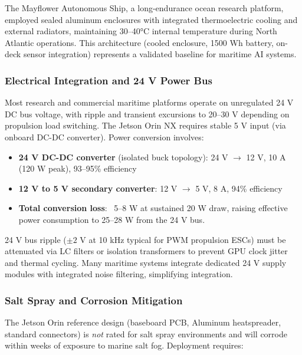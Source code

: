 The Mayflower Autonomous Ship, a long-endurance ocean research platform, employed sealed aluminum enclosures with integrated thermoelectric cooling and external radiators, maintaining 30--40°C internal temperature during North Atlantic operations. \cite{Promare2023MayflowerAutonomousShip} This architecture (cooled enclosure, 1500 Wh battery, on-deck sensor integration) represents a validated baseline for maritime AI systems.

\subsubsection{Electrical Integration and 24 V Power Bus}

Most research and commercial maritime platforms operate on unregulated 24 V DC bus voltage, with ripple and transient excursions to 20--30 V depending on propulsion load switching. The Jetson Orin NX requires stable 5 V input (via onboard DC-DC converter). Power conversion involves:

\begin{itemize}
  \item \textbf{24 V DC-DC converter} (isolated buck topology): 24 V $\rightarrow$ 12 V, 10 A (120 W peak), 93--95\% efficiency
  \item \textbf{12 V to 5 V secondary converter}: 12 V $\rightarrow$ 5 V, 8 A, 94\% efficiency
  \item \textbf{Total conversion loss}: ~5--8 W at sustained 20 W draw, raising effective power consumption to 25--28 W from the 24 V bus.
\end{itemize}

24 V bus ripple ($\pm 2$ V at 10 kHz typical for PWM propulsion ESCs) must be attenuated via LC filters or isolation transformers to prevent GPU clock jitter and thermal cycling. Many maritime systems integrate dedicated 24 V supply modules with integrated noise filtering, simplifying integration.

\subsubsection{Salt Spray and Corrosion Mitigation}

The Jetson Orin reference design (baseboard PCB, Aluminum heatspreader, standard connectors) is \emph{not} rated for salt spray environments and will corrode within weeks of exposure to marine salt fog. Deployment requires:

